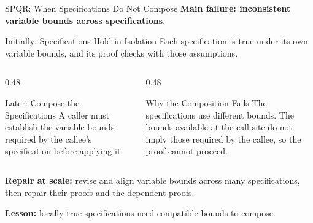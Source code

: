 \documentclass[aspectratio=169,xcolor=dvipsnames]{beamer}
\begin{document}
\begin{frame}{SPQR: When Specifications Do Not Compose}
    \small
    \textbf{Main failure: inconsistent variable bounds across specifications.}
    \begin{block}{Initially: Specifications Hold in Isolation}
        Each specification is true under its own variable bounds,
        and its proof checks with those assumptions.
    \end{block}
    \begin{columns}[T,onlytextwidth]
        \begin{column}{0.48\textwidth}
            \begin{exampleblock}{Later: Compose the Specifications}
                A caller must establish the variable bounds required by the callee's
                specification before applying it.
            \end{exampleblock}
        \end{column}
        \begin{column}{0.48\textwidth}
            \begin{exampleblock}{Why the Composition Fails}
                The specifications use different bounds.
                The bounds available at the call site do not imply those required
                by the callee, so the proof cannot proceed.
            \end{exampleblock}
        \end{column}
    \end{columns}
    \medskip
    \textbf{Repair at scale:} revise and align variable bounds across many specifications,
    then repair their proofs and the dependent proofs.
    \medskip

    \footnotesize
    \textbf{Lesson:} locally true specifications need compatible bounds to compose.
\end{frame}
\end{document}

